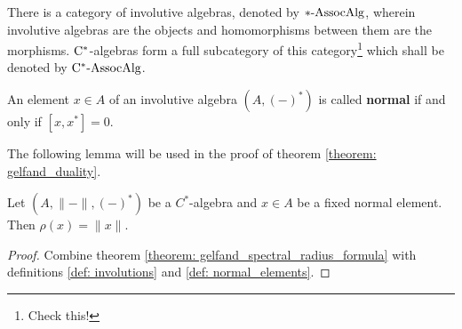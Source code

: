         \begin{convention}
            There is a category of involutive algebras, denoted by $*\text{-}\mathrm{Assoc}\mathrm{Alg}$, wherein involutive algebras are the objects and homomorphisms between them are the morphisms. $\mathrm{C}^*$-algebras form a full subcategory of this category\footnote{Check this!} which shall be denoted by $\mathrm{C}^*\text{-}\mathrm{Assoc}\mathrm{Alg}$. 
        \end{convention}
            
        \begin{definition} \label{def: normal_elements}
            An element $x \in A$ of an involutive algebra $(A, (-)^*)$ is called \textbf{normal} if and only if $[x, x^*] = 0$.
        \end{definition}
        The following lemma will be used in the proof of theorem \ref{theorem: gelfand_duality}.
        \begin{lemma} \label{prop: spectral_radii_and_norms_of_normal_elements}
            Let $(A, \|-\|, (-)^*)$ be a $C^*$-algebra and $x \in A$ be a fixed normal element. Then $\rho(x) = \|x\|$.
        \end{lemma}
            \begin{proof}
                Combine theorem \ref{theorem: gelfand_spectral_radius_formula} with definitions \ref{def: involutions} and \ref{def: normal_elements}.
            \end{proof}
            
